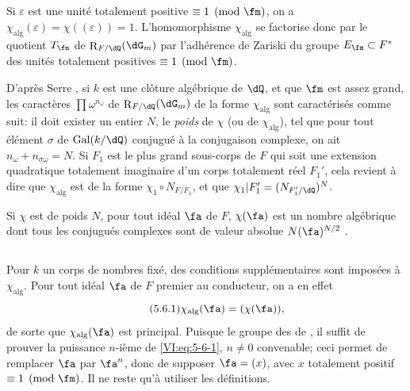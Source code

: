 \documentclass[oneside]{book}
\DeclareMathOperator{\gal}{Gal}
\DeclareMathOperator{\res}{R} %
\theoremstyle{sga-source}
\theoremstyle{sga-source-dash}
\theoremstyle{sga-source-dotdash}
\theoremstyle{sga-source-number-note-dash}
\theoremstyle{sga-source-note-number-dotdash}
\theoremstyle{sga-source-example-dotdash}
\theoremstyle{sga-source-inline-number}
\theoremstyle{sga-source-bare-number}
\theoremstyle{sga-source}
\begin{document}
\subsection{}\label{VI:5-5}

Si $\varepsilon$ est une unité totalement positive $\equiv 1\pmod\fm$, on a 
$\chi_\text{alg}(\varepsilon) = \chi((\varepsilon)) = 1$. L'homomorphisme 
$\chi_\text{alg}$ se factorise donc par le quotient $T_\fm$ de 
$\res_{F/\dQ}(\dG_m)$ par l'adhérence de Zariski du groupe 
$E_\fm\subset F^\ast$ des unités totalement positives $\equiv 1\pmod\fm$. 

D'après Serre \cite[II.3]{se68}, si $k$ est une clôture algébrique de 
$\dQ$, et que $\fm$ est assez grand, les caractères $\prod \omega^{n_\omega}$ 
de $\res_{F/\dQ}(\dG_m)$ de la forme $\chi_\text{alg}$ sont caractérisés 
comme suit: il doit exister un entier $N$, le \emph{poids} de $\chi$ (ou de 
$\chi_\text{alg}$), tel que pour tout élément $\sigma$ de $\gal(k/\dQ)$ 
conjugué à la conjugaison complexe, on ait $n_\omega+n_{\sigma \omega}=N$. Si 
$F_1$ est le plus grand sous-corps de $F$ qui soit une extension quadratique 
totalement imaginaire d'un corps totalement réel $F_1'$, cela revient à 
dire que $\chi_\text{alg}$ est de la forme $\chi_1\circ N_{F/F_1}$, et que 
$\var{\chi_1|F_1=(N_{F_1/\dQ})^N}{\chi_1|F_1'=(N_{F_1'/\dQ})^N}{S45-SOL-0879}$. 

Si $\chi$ est de poids $N$, pour tout idéal $\fa$ de $F$, $\chi(\fa)$ est un 
nombre algébrique dont tous les conjugués complexes sont de valeur absolue 
$N(\fa)^{N/2}$ \cite[II.3 prop.2]{se68}. 





\subsection{}\label{VI:5-6}

Pour $k$ un corps de nombres fixé, des conditions supplémentaires sont 
imposées à $\chi_\text{alg}$. Pour tout idéal $\fa$ de $F$ premier au 
conducteur, on a en effet 
\begin{equation*}\tag{5.6.1}\label{VI:eq:5-6-1}
  \chi_\text{alg}(\fa) = (\chi(\fa)) \text{,} 
\end{equation*}
de sorte que $\chi_\text{alg}(\fa)$ est principal. Puisque le groupe des 
 de , il suffit de prouver la 
puissance $n$-ième de \eqref{VI:eq:5-6-1}, $n\ne 0$ convenable; ceci permet 
de remplacer $\fa$ par $\fa^n$, donc de supposer $\fa=(x)$, avec $x$ totalement 
positif $\equiv 1\pmod\fm$. Il ne reste qu'à utiliser les définitions. 
\end{document}
